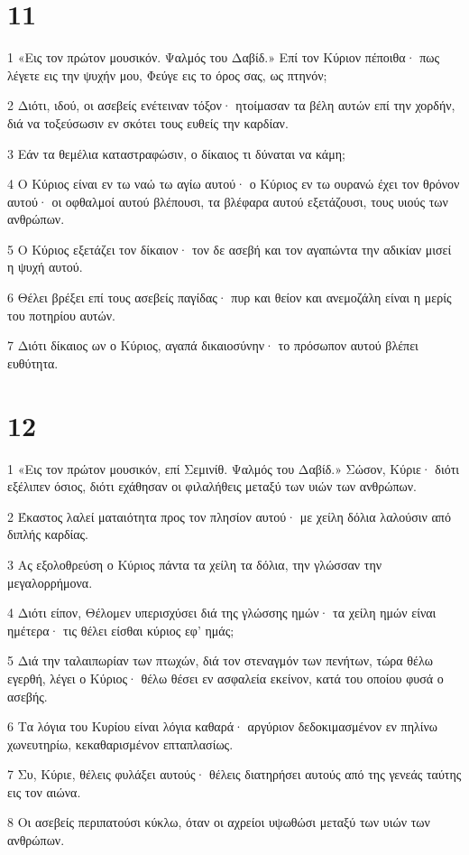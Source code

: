 \chapter{11}

\par 1 «Εις τον πρώτον μουσικόν. Ψαλμός του Δαβίδ.» Επί τον Κύριον πέποιθα· πως λέγετε εις την ψυχήν μου, Φεύγε εις το όρος σας, ως πτηνόν;
\par 2 Διότι, ιδού, οι ασεβείς ενέτειναν τόξον· ητοίμασαν τα βέλη αυτών επί την χορδήν, διά να τοξεύσωσιν εν σκότει τους ευθείς την καρδίαν.
\par 3 Εάν τα θεμέλια καταστραφώσιν, ο δίκαιος τι δύναται να κάμη;
\par 4 Ο Κύριος είναι εν τω ναώ τω αγίω αυτού· ο Κύριος εν τω ουρανώ έχει τον θρόνον αυτού· οι οφθαλμοί αυτού βλέπουσι, τα βλέφαρα αυτού εξετάζουσι, τους υιούς των ανθρώπων.
\par 5 Ο Κύριος εξετάζει τον δίκαιον· τον δε ασεβή και τον αγαπώντα την αδικίαν μισεί η ψυχή αυτού.
\par 6 Θέλει βρέξει επί τους ασεβείς παγίδας· πυρ και θείον και ανεμοζάλη είναι η μερίς του ποτηρίου αυτών.
\par 7 Διότι δίκαιος ων ο Κύριος, αγαπά δικαιοσύνην· το πρόσωπον αυτού βλέπει ευθύτητα.

\chapter{12}

\par 1 «Εις τον πρώτον μουσικόν, επί Σεμινίθ. Ψαλμός του Δαβίδ.» Σώσον, Κύριε· διότι εξέλιπεν όσιος, διότι εχάθησαν οι φιλαλήθεις μεταξύ των υιών των ανθρώπων.
\par 2 Έκαστος λαλεί ματαιότητα προς τον πλησίον αυτού· με χείλη δόλια λαλούσιν από διπλής καρδίας.
\par 3 Ας εξολοθρεύση ο Κύριος πάντα τα χείλη τα δόλια, την γλώσσαν την μεγαλορρήμονα.
\par 4 Διότι είπον, Θέλομεν υπερισχύσει διά της γλώσσης ημών· τα χείλη ημών είναι ημέτερα· τις θέλει είσθαι κύριος εφ' ημάς;
\par 5 Διά την ταλαιπωρίαν των πτωχών, διά τον στεναγμόν των πενήτων, τώρα θέλω εγερθή, λέγει ο Κύριος· θέλω θέσει εν ασφαλεία εκείνον, κατά του οποίου φυσά ο ασεβής.
\par 6 Τα λόγια του Κυρίου είναι λόγια καθαρά· αργύριον δεδοκιμασμένον εν πηλίνω χωνευτηρίω, κεκαθαρισμένον επταπλασίως.
\par 7 Συ, Κύριε, θέλεις φυλάξει αυτούς· θέλεις διατηρήσει αυτούς από της γενεάς ταύτης εις τον αιώνα.
\par 8 Οι ασεβείς περιπατούσι κύκλω, όταν οι αχρείοι υψωθώσι μεταξύ των υιών των ανθρώπων.

